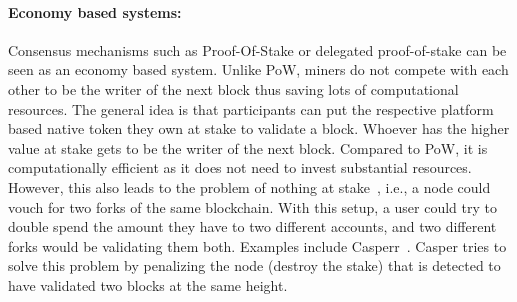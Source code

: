 \paragraph{Economy based systems:}Consensus mechanisms such as Proof-Of-Stake
or delegated proof-of-stake can be seen as an economy based system. Unlike PoW,
miners do not compete with each other to be the writer of the next block thus
saving lots of computational resources. The general idea is that participants
can put the respective platform based native token they own at stake to
validate a block. Whoever has the higher value at stake gets to be the writer
of the next block. Compared to PoW, it is computationally efficient as it does
not need to invest substantial resources. However, this also leads to the
problem of nothing at stake~\cite{houy2014will}, i.e., a node could vouch for
two forks of the same blockchain. With this setup, a user could try to double
spend the amount they have to two different accounts, and two different forks
would be validating them both. Examples include
Casperr~\cite{buterin2017casper}. Casper tries to solve this problem by
penalizing the node (destroy the stake) that is detected to have validated two
blocks at the same height.
